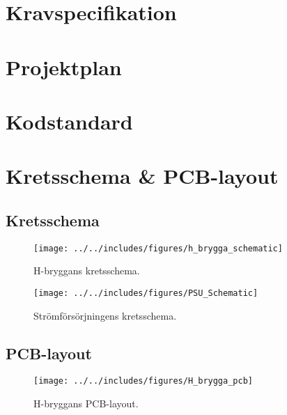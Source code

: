 \appendix
\section{Kravspecifikation}
\label{apx:Kravspec}


\section{Projektplan}
\label{apx:Projektplan}


\section{Kodstandard}
\label{apx:Kodstandard}




\section{Kretsschema \& PCB-layout}
\subsection{Kretsschema}
\begin{landscape}
\begin{figure}[htbp!]
\centering
\texttt{[image: ../../includes/figures/h\_brygga\_schematic]}
\caption{H-bryggans kretsschema.}
\label{fig:appendix_h_brygga_schema}
\end{figure}
\end{landscape}

\begin{landscape}
\begin{figure}[htbp!]
\centering
\texttt{[image: ../../includes/figures/PSU\_Schematic]}
\caption{Strömförsörjningens kretsschema.}
\label{fig:appendix_PSU_schema}
\end{figure}
\end{landscape}

\subsection{PCB-layout}
\begin{figure}[htbp!]
\centering
\texttt{[image: ../../includes/figures/H\_brygga\_pcb]}
\caption{H-bryggans PCB-layout.}
\label{fig:appendix_pcb_layout}
\end{figure}

